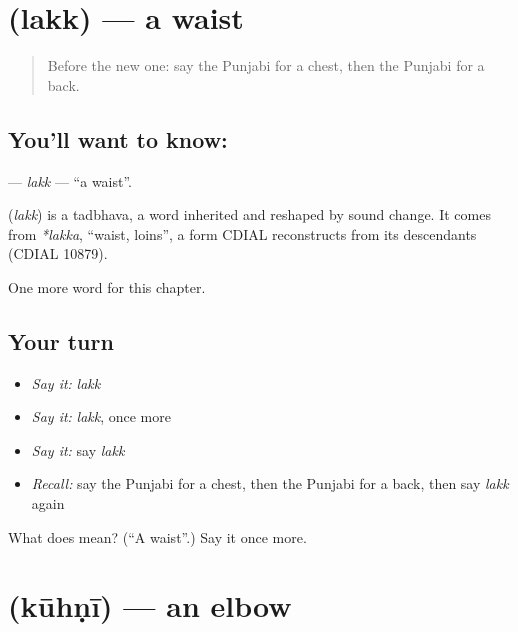 \section[\texorpdfstring{\pa{ਲੱਕ} (lakk)}{ਲੱਕ (lakk)}]{ (lakk) — a waist}

\label{lesson:PA-C135-lakk}



\begin{quote}
Before the new one: say the Punjabi for a chest, then the Punjabi for a back.
\end{quote}

\subsection*{You'll want to know: }
\textbf{} — \emph{lakk} — \textquotedblleft{}a waist\textquotedblright{}.

\begin{cousinweb}
\textbf{} (\emph{lakk}) is a tadbhava, a word inherited and reshaped by sound change. It comes from \emph{*lakka}, \textquotedblleft{}waist, loins\textquotedblright{}, a form CDIAL reconstructs from its descendants (CDIAL 10879).
\end{cousinweb}

\begin{grammarlens}[title={What you've built}]
One more word for this chapter.
\end{grammarlens}

\subsection*{Your turn}
\begin{itemize}
\raggedright
  \item \emph{Say it:} \emph{lakk}
  \item \emph{Say it:} \emph{lakk}, once more
  \item \emph{Say it:} say \emph{lakk}
  \item \emph{Recall:} say the Punjabi for a chest, then the Punjabi for a back, then say \emph{lakk} again
\end{itemize}

\begin{tcolorbox}[breakable,colback=teal!4,colframe=teal!35!black,title={Before you move on}]
What does  mean? (\textquotedblleft{}A waist\textquotedblright{}.) Say it once more.
\end{tcolorbox}
\section[\texorpdfstring{\pa{ਕੂਹਣੀ} (kūhṇī)}{ਕੂਹਣੀ (kūhṇī)}]{ (kūhṇī) — an elbow}

